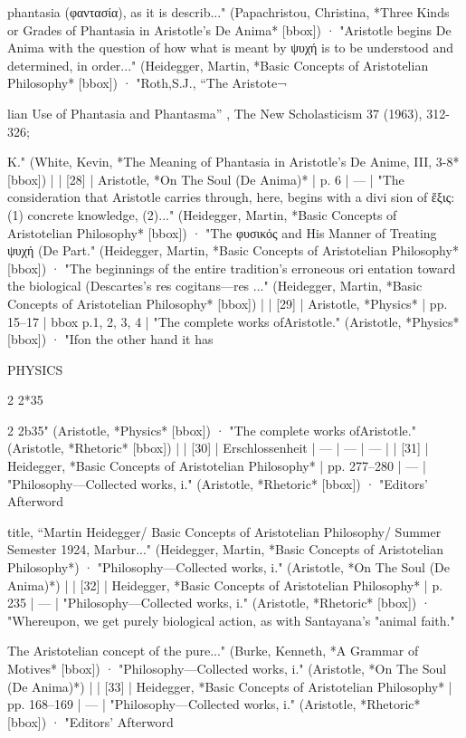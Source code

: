phantasia (φαντασία), as it is describ..." (Papachristou, Christina, *Three Kinds or Grades of Phantasia in Aristotle's De Anima* [bbox]) · "Aristotle begins De Anima with the question of how what is meant by ψυχή is to be understood and determined, in order..." (Heidegger, Martin, *Basic Concepts of Aristotelian Philosophy* [bbox]) · "Roth,S.J., “The Aristote¬

lian Use of Phantasia and Phantasma” , The New Scholasticism 37 (1963), 312-326;

K." (White, Kevin, *The Meaning of Phantasia in Aristotle's De Anime, III, 3-8* [bbox]) |
| [28] | Aristotle, *On The Soul (De Anima)* | p. 6 | — | "The consideration that Aristotle carries through, here, begins with a divi­ sion of ἕξις: (1) concrete knowledge, (2)..." (Heidegger, Martin, *Basic Concepts of Aristotelian Philosophy* [bbox]) · "The φυσικός and His Manner of Treating ψυχή (De Part." (Heidegger, Martin, *Basic Concepts of Aristotelian Philosophy* [bbox]) · "The beginnings of the entire tradition’s erroneous ori­ entation toward the biological (Descartes’s res cogitans—res ..." (Heidegger, Martin, *Basic Concepts of Aristotelian Philosophy* [bbox]) |
| [29] | Aristotle, *Physics* | pp. 15–17 | bbox p.1, 2, 3, 4 | "The complete works ofAristotle." (Aristotle, *Physics* [bbox]) · "Ifon the other hand it has

PHYSICS

2 2*35

2 2b35" (Aristotle, *Physics* [bbox]) · "The complete works ofAristotle." (Aristotle, *Rhetoric* [bbox]) |
| [30] | Erschlossenheit | — | — | — |
| [31] | Heidegger, *Basic Concepts of Aristotelian Philosophy* | pp. 277–280 | — | "Philosophy—Collected works, i." (Aristotle, *Rhetoric* [bbox]) · "Editors' Afterword

title, “Martin Heidegger/ Basic Concepts of Aristotelian Philosophy/ Summer Semester 1924, Marbur..." (Heidegger, Martin, *Basic Concepts of Aristotelian Philosophy*) · "Philosophy—Collected works, i." (Aristotle, *On The Soul (De Anima)*) |
| [32] | Heidegger, *Basic Concepts of Aristotelian Philosophy* | p. 235 | — | "Philosophy—Collected works, i." (Aristotle, *Rhetoric* [bbox]) · "Whereupon, we get purely biological action, as with Santayana's "animal faith."

The Aristotelian concept of the pure..." (Burke, Kenneth, *A Grammar of Motives* [bbox]) · "Philosophy—Collected works, i." (Aristotle, *On The Soul (De Anima)*) |
| [33] | Heidegger, *Basic Concepts of Aristotelian Philosophy* | pp. 168–169 | — | "Philosophy—Collected works, i." (Aristotle, *Rhetoric* [bbox]) · "Editors' Afterword

